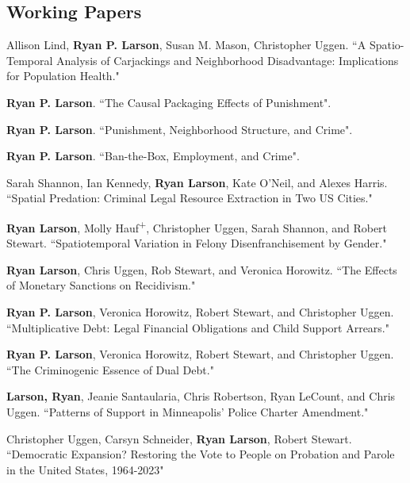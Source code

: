\documentclass[letterpaper]{article}
\renewenvironment{itemize}{
  \begin{list}{}{
    \setlength{\leftmargin}{1.5em}
  }
}{
  \end{list}
}
\begin{document}
\subsection*{Working Papers}
\begin{itemize}

\item Allison Lind, \textbf{Ryan P. Larson}, Susan M. Mason, Christopher Uggen. ``A Spatio-Temporal Analysis of Carjackings and Neighborhood Disadvantage: Implications for Population Health."
\item \textbf{Ryan P. Larson}. ``The Causal Packaging Effects of Punishment".
\item \textbf{Ryan P. Larson}. ``Punishment, Neighborhood Structure, and Crime".
\item \textbf{Ryan P. Larson}. ``Ban-the-Box, Employment, and Crime".
\item Sarah Shannon, Ian Kennedy, \textbf{Ryan Larson}, Kate O'Neil, and Alexes Harris. ``Spatial Predation: Criminal Legal Resource Extraction in Two US Cities."
\item \textbf{Ryan Larson}, Molly Hauf\textsuperscript{+}, Christopher Uggen, Sarah Shannon, and Robert Stewart. ``Spatiotemporal Variation in Felony Disenfranchisement by Gender."
\item \textbf{Ryan Larson},  Chris Uggen, Rob Stewart, and Veronica Horowitz. ``The Effects of Monetary Sanctions on Recidivism."
\item \textbf{Ryan P. Larson}, Veronica Horowitz, Robert Stewart, and Christopher Uggen. ``Multiplicative Debt: Legal Financial Obligations and Child Support Arrears."
\item \textbf{Ryan P. Larson}, Veronica Horowitz, Robert Stewart, and Christopher Uggen. ``The Criminogenic Essence of Dual Debt."
\item \textbf{Larson, Ryan}, Jeanie Santaularia, Chris Robertson, Ryan LeCount, and Chris Uggen.  ``Patterns of Support in Minneapolis’ Police Charter Amendment." 
\item Christopher Uggen, Carsyn Schneider, \textbf{Ryan Larson}, Robert Stewart. ``Democratic Expansion? Restoring the Vote to People on Probation and Parole in the United States, 1964-2023"



\end{itemize}
\end{document}
